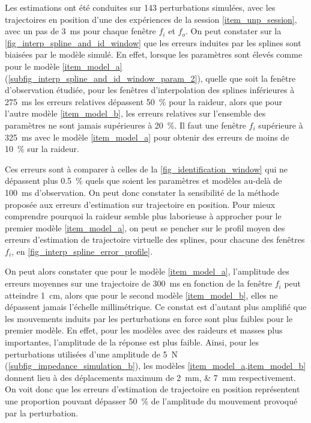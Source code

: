 

Les estimations ont été conduites sur 143 perturbations simulées, avec les trajectoires en position d'une des expériences de la session \cref{item_unp_session}, avec un pas de \SI{3}{\milli\second} pour chaque fenêtre $f_i$ et $f_o$. On peut constater sur la \cref{fig_interp_spline_and_id_window} que les erreurs induites par les splines sont biaisées par le modèle simulé. En effet, lorsque les paramètres sont élevés comme pour le modèle \cref{item_model_a} (\cref{subfig_interp_spline_and_id_window_param_2}), quelle que soit la fenêtre d'observation étudiée, pour les fenêtres d'interpolation des splines inférieures à \SI{275}{\milli\second} les erreurs relatives dépassent \SI{50}{\percent} pour la raideur, alors que pour l'autre modèle \cref{item_model_b}, les erreurs relatives sur l'ensemble des paramètres ne sont jamais supérieures à \SI{20}{\percent}. Il faut une fenêtre $f_i$ supérieure à \SI{325}{\milli\second} avec le modèle \cref{item_model_a} pour obtenir des erreurs de moins de \SI{10}{\percent} sur la raideur.

%


Ces erreurs sont à comparer à celles de la \cref{fig_identification_window} qui ne dépassent plus \SI{0.5}{\percent} quels que soient les paramètres et modèles au-delà de \SI{100}{\milli\second} d'observation. On peut donc constater la sensibilité de la méthode proposée aux erreurs d'estimation sur trajectoire en position. Pour mieux comprendre pourquoi la raideur semble plus laborieuse à approcher pour le premier modèle \cref{item_model_a}, on peut se pencher sur le profil moyen des erreurs d'estimation de trajectoire virtuelle des splines, pour chacune des fenêtres $f_i$, en \cref{fig_interp_spline_error_profile}.



On peut alors constater que pour le modèle \cref{item_model_a}, l'amplitude des erreurs moyennes sur une trajectoire de \SI{300}{\milli\second} en fonction de la fenêtre $f_i$ peut atteindre \SI{1}{\centi\meter}, alors que pour le second modèle \cref{item_model_b}, elles ne dépassent jamais l'échelle millimétrique. Ce constat est d'autant plus amplifié que les mouvements induits par les perturbations en force sont plus faibles pour le premier modèle. En effet, pour les modèles avec des raideurs et masses plus importantes, l'amplitude de la réponse est plus faible. Ainsi, pour les perturbations utilisées d'une amplitude de \SI{5}{\newton} (\cref{subfig_impedance_simulation_b}), les modèles \cref{item_model_a,item_model_b} donnent lieu à des déplacements maximum de \SIlist{2;7}{\milli\meter} respectivement. On voit donc que les erreurs d'estimation de trajectoire en position représentent une proportion pouvant dépasser \SI{50}{\percent} de l'amplitude du mouvement provoqué par la perturbation.

